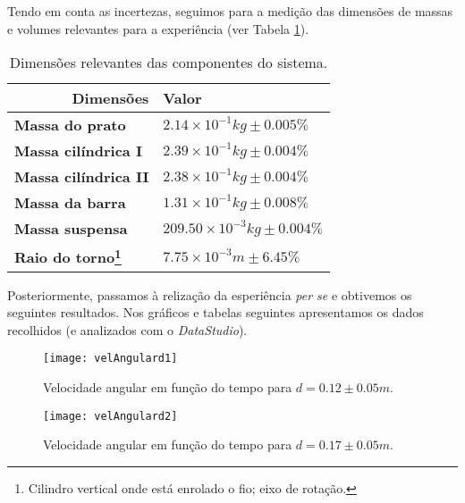 \documentclass[11pt]{report}
\begin{document}
Tendo em conta as incertezas, seguimos para a medição das dimensões de massas e volumes relevantes para a experiência (ver Tabela \ref{tabela:5.2}).
\begin{table}[htbp]
  \centering
    \begin{tabular}{|p{50mm}|p{45mm}|}
    \toprule
    \multicolumn{1}{|r|}{\textbf{Dimensões}} & \cellcolor[rgb]{ 0,  .69,  .941}\textbf{Valor} \\
    \midrule
    \rowcolor[rgb]{ 1,  .753,  0} \textbf{Massa do prato} & \cellcolor[rgb]{ 1,  1,  1}$2.14\times 10^{-1} kg\pm 0.005\%$ \\
    \midrule
    \rowcolor[rgb]{ 1,  .753,  0} \textbf{Massa cilíndrica I} & \cellcolor[rgb]{ 1,  1,  1}$2.39 \times 10^{-1}kg \pm 0.004\%$ \\
    \midrule
    \rowcolor[rgb]{ 1,  .753,  0} \textbf{Massa cilíndrica II} & \cellcolor[rgb]{ 1,  1,  1}$2.38 \times 10^{-1}kg \pm 0.004\%$ \\
    \midrule
    \rowcolor[rgb]{ 1,  .753,  0} \textbf{Massa da barra} & \cellcolor[rgb]{ 1,  1,  1}$1.31 \times 10^{-1}kg \pm 0.008\%$ \\
     \midrule
      \rowcolor[rgb]{ 1,  .753,  0} \textbf{Massa suspensa} & \cellcolor[rgb]{ 1,  1,  1}$209.50 \times 10^{-3}kg \pm 0.004\%$ \\
     \midrule
    \rowcolor[rgb]{ 1,  .753,  0} \textbf{Raio do torno\footnote{Cilindro vertical onde está enrolado o fio; eixo de rotação.}} & \cellcolor[rgb]{ 1,  1,  1}$7.75 \times 10^{-3}m \pm 6.45\%$ \\
    \bottomrule
    \end{tabular}%
  \label{tab:addlabel}%
    \caption{Dimensões relevantes das componentes do sistema. \label{tabela:5.2}}
\end{table}%

\newpage
Posteriormente, passamos à relização da esperiência \textit{per se} e obtivemos os seguintes resultados. Nos gráficos e tabelas seguintes apresentamos os dados recolhidos (e analizados com o \textit{DataStudio}).

\begin{figure} [H]
\center
\texttt{[image: velAngulard1]}
\caption{Velocidade angular em função do tempo para $d=0.12\pm0.05 m $. \label{figura:5.1}}
\end{figure}

\begin{figure} [H]
\center
\texttt{[image: velAngulard2]}
\caption{Velocidade angular em função do tempo para $d=0.17\pm0.05 m $. \label{figura:5.2}}
\end{figure}
\end{document}
